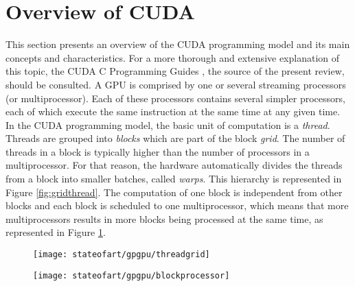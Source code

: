 \section{Overview of CUDA}


This section presents an overview of the CUDA programming model and its main concepts and characteristics.
For a more thorough and extensive explanation of this topic, the CUDA C Programming Guides \cite{Nvidia2014}, the source of the present review, should be consulted.
A GPU is comprised by one or several streaming processors (or multiprocessor).
Each of these processors contains several simpler processors, each of which execute the same instruction at the same time at any given time.
In the CUDA programming model, the basic unit of computation is a \emph{thread}.
Threads are grouped into \emph{blocks} which are part of the block \emph{grid}.
The number of threads in a block is typically higher than the number of processors in a multiprocessor.
For that reason, the hardware automatically divides the threads from a block into smaller batches, called \emph{warps}.
This hierarchy is represented in Figure \ref{fig:gridthread}.
The computation of one block is independent from other blocks and each block is scheduled to one multiprocessor, which means that more multiprocessors results in more blocks being processed at the same time, as represented in Figure \ref{fig:blockprocessor}.

\begin{figure}[ht]
\centering
\begin{minipage}[b]{.45\textwidth}
	\centering
	\texttt{[image: stateofart/gpgpu/threadgrid]}
	\label{fig:gridthread}  
\end{minipage}
\begin{minipage}[b]{.45\textwidth}
    \centering
    \texttt{[image: stateofart/gpgpu/blockprocessor]}
    \label{fig:blockprocessor}
\end{minipage}
\end{figure}

